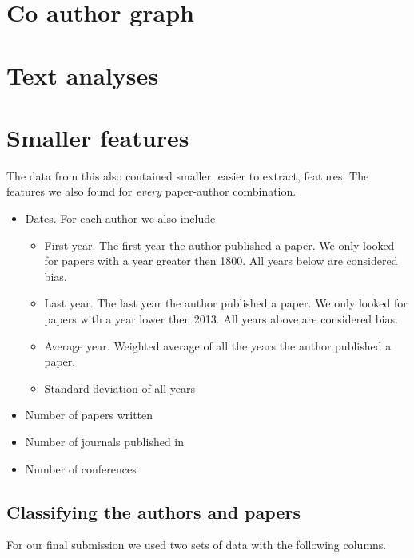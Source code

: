 
\section{Co author graph \label{sec:graph-implementation}}



\section{Text analyses \label{sec:text-implementation}}



\section{Smaller features \label{sec:smaller-features-implementation}}

The data from this also contained smaller, easier to extract, features. The features we also found for \textit{every} paper-author combination.

\begin{itemize}
\item[]Dates. For each author we also include
\begin{itemize}
\item[] First year. The first year the author published a paper. We only looked for papers with a year greater then 1800. All years below are considered bias.
\item[] Last year. The last year the author published a paper. We only looked for papers with a year lower then 2013. All years above are considered bias.
\item[] Average year. Weighted average of all the years the author published a paper.
\item[] Standard deviation of all years
\end{itemize}
\item[] Number of papers written
\item[] Number of journals published in 
\item[] Number of conferences
\end{itemize}


\subsection{Classifying the authors and papers \label{sec:classifier-implementation}}

For our final submission we used two sets of data with the following columns.

